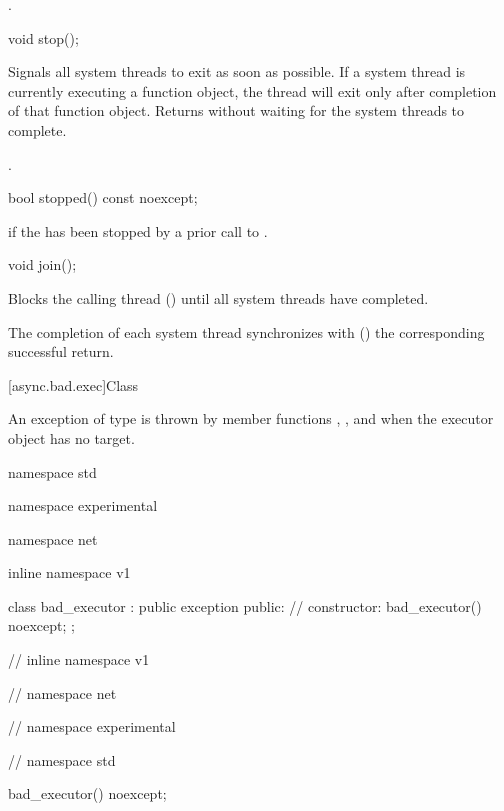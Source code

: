 \begin{itemdescr}
\pnum
\returns {}.
\end{itemdescr}

\begin{itemdecl}
void stop();
\end{itemdecl}

\begin{itemdescr}
\pnum
\effects Signals all system threads to exit as soon as possible. If a system thread is currently executing a function object, the thread will exit only after completion of that function object. Returns without waiting for the system threads to complete.

\pnum
\postconditions {}.
\end{itemdescr}

\begin{itemdecl}
bool stopped() const noexcept;
\end{itemdecl}

\begin{itemdescr}
\pnum
\returns {} if the  has been stopped by a prior call to .
\end{itemdescr}

\begin{itemdecl}
void join();
\end{itemdecl}

\begin{itemdescr}
\pnum
\effects Blocks the calling thread () until all system threads have completed.

\pnum
\sync The completion of each system thread synchronizes with () the corresponding successful  return.
\end{itemdescr}



[async.bad.exec]{Class }

\pnum
An exception of type  is thrown by  member functions , , and  when the executor object has no target.

\begin{itemdecl}
namespace std {
namespace experimental {
namespace net {
inline namespace v1 {

  class bad_executor : public exception
  {
  public:
    // constructor:
    bad_executor() noexcept;
  };

} // inline namespace v1
} // namespace net
} // namespace experimental
} // namespace std

bad_executor() noexcept;
\end{itemdecl}

